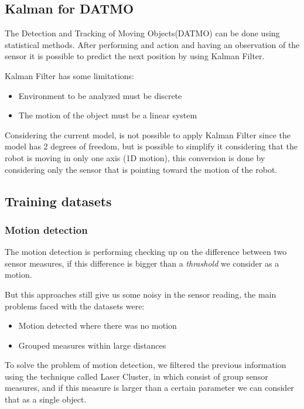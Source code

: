 \documentclass{article}
\begin{document}
\subsection{Kalman for DATMO}
The Detection and Tracking of Moving Objects(DATMO) can be done using statistical methods. After performing and action and having an observation of the sensor it is possible to predict the next position by using Kalman Filter. 

Kalman Filter has some limitations:
\begin{itemize}
\item Environment to be analyzed must be discrete
\item The motion of the object must be a linear system
\end{itemize}

Considering the current model, is not possible to apply Kalman Filter since the model has 2 degrees of freedom, but is possible to simplify it considering that the robot is moving in only one axis (1D motion), this conversion is done by considering only the sensor that is pointing toward the motion of the robot.

\subsection{Training datasets}

\subsubsection{Motion detection}

The motion detection is performing checking up on the difference between two sensor measures, if this difference is bigger than a \emph{thrashold} we consider as a motion.

But this approaches still give us some noisy in the sensor reading, the main problems faced with the datasets were:
\begin{itemize}
\item Motion detected where there was no motion
\item Grouped measures within large distances
\end{itemize}

To solve the problem of motion detection, we filtered the previous information using the technique called Laser Cluster, in which consist of group sensor measures, and if this measure is larger than a certain parameter we can consider that as a single object. 
\end{document}

